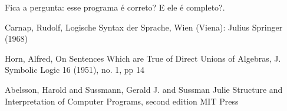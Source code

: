 \documentclass{article}
\begin{document}
  Fica a pergunta: esse programa é correto? E ele é completo?.


  \begin{thebibliography}{1}

     Carnap, Rudolf,
     Logische Syntax der Sprache,
     Wien (Viena): Julius Springer (1968)

     Horn, Alfred,
     On Sentences Which are True of Direct Unions of Algebras,
     J. Symbolic Logic 16 (1951),
     no. 1,
     pp 14

     Abelsson, Harold and Sussmann, Gerald J. and Sussman Julie
     Structure and Interpretation of Computer Programs, second edition
     MIT Press

  \end{thebibliography}
\end{document}

